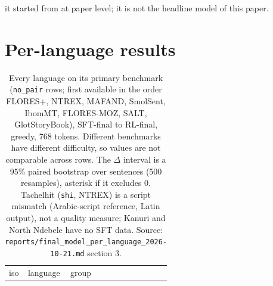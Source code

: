 it started from at paper level; it is not the headline model of this paper.

\clearpage
\appendix

\section{Per-language results}\label{per-language-results}

{\scriptsize\setlength{\tabcolsep}{3pt}
\begin{longtable}[]{@{}
  >{\raggedright\arraybackslash}p{}
  >{\raggedright\arraybackslash}p{}
  >{\raggedright\arraybackslash}p{}
  >{\raggedright\arraybackslash}p{}
  >{\raggedleft\arraybackslash}p{}
  >{\raggedleft\arraybackslash}p{}
  >{\raggedleft\arraybackslash}p{}
  >{\raggedleft\arraybackslash}p{}
  >{\raggedleft\arraybackslash}p{}
  >{\raggedleft\arraybackslash}p{}
  >{\raggedleft\arraybackslash}p{}@{}}
\caption{Every language on its primary benchmark (\protect\texttt{no\_pair} rows; first available in the order FLORES+, NTREX, MAFAND, SmolSent, IbomMT, FLORES-MOZ, SALT, GlotStoryBook), SFT-final to RL-final, greedy, 768 tokens. Different benchmarks have different difficulty, so values are not comparable across rows. The \(\Delta\) interval is a 95\% paired bootstrap over sentences (500 resamples), asterisk if it excludes 0. Tachelhit (\protect\texttt{shi}, NTREX) is a script mismatch (Arabic-script reference, Latin output), not a quality measure; Kanuri and North Ndebele have no SFT data. Source: \protect\texttt{reports/final\_model\_per\_language\_2026-10-21.md} section 3.}\label{tab:t_master}\tabularnewline
\toprule\noalign{}
\begin{minipage}[b]{\linewidth}\raggedright
iso
\end{minipage} & \begin{minipage}[b]{\linewidth}\raggedright
language
\end{minipage} & \begin{minipage}[b]{\linewidth}\raggedright
group
\end{minipage} & \begin{minipage}[b]{\linewidth}\raggedright

\end{minipage}
\end{longtable}}
